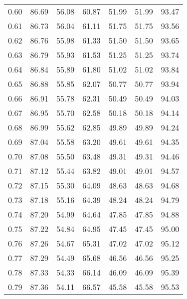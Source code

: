 \begin{tabular}{|c|c|c|c|c|c|c|}
      0.60 &     86.69 &     56.08 &      60.87 &   51.99 &      51.99 &         93.47 \\
      0.61 &     86.73 &     56.04 &      61.11 &   51.75 &      51.75 &         93.56 \\
      0.62 &     86.76 &     55.98 &      61.33 &   51.50 &      51.50 &         93.65 \\
      0.63 &     86.79 &     55.93 &      61.53 &   51.25 &      51.25 &         93.74 \\
      0.64 &     86.84 &     55.89 &      61.80 &   51.02 &      51.02 &         93.84 \\
      0.65 &     86.88 &     55.85 &      62.07 &   50.77 &      50.77 &         93.94 \\
      0.66 &     86.91 &     55.78 &      62.31 &   50.49 &      50.49 &         94.03 \\
      0.67 &     86.95 &     55.70 &      62.58 &   50.18 &      50.18 &         94.14 \\
      0.68 &     86.99 &     55.62 &      62.85 &   49.89 &      49.89 &         94.24 \\
      0.69 &     87.04 &     55.58 &      63.20 &   49.61 &      49.61 &         94.35 \\
      0.70 &     87.08 &     55.50 &      63.48 &   49.31 &      49.31 &         94.46 \\
      0.71 &     87.12 &     55.44 &      63.82 &   49.01 &      49.01 &         94.57 \\
      0.72 &     87.15 &     55.30 &      64.09 &   48.63 &      48.63 &         94.68 \\
      0.73 &     87.18 &     55.16 &      64.39 &   48.24 &      48.24 &         94.79 \\
      0.74 &     87.20 &     54.99 &      64.64 &   47.85 &      47.85 &         94.88 \\
      0.75 &     87.22 &     54.84 &      64.95 &   47.45 &      47.45 &         95.00 \\
      0.76 &     87.26 &     54.67 &      65.31 &   47.02 &      47.02 &         95.12 \\
      0.77 &     87.29 &     54.49 &      65.68 &   46.56 &      46.56 &         95.25 \\
      0.78 &     87.33 &     54.33 &      66.14 &   46.09 &      46.09 &         95.39 \\
      0.79 &     87.36 &     54.11 &      66.57 &   45.58 &      45.58 &         95.53 \\

\end{tabular}
